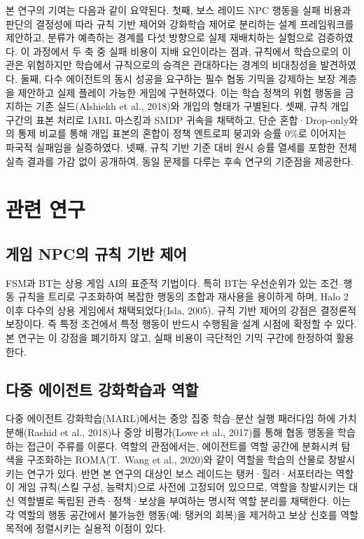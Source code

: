 \documentclass[12pt]{article}      %
\begin{document}
본 연구의 기여는 다음과 같이 요약된다. 첫째, 보스 레이드 NPC 행동을 실패 비용과
판단의 결정성에 따라 규칙 기반 제어와 강화학습 제어로 분리하는 설계 프레임워크를
제안하고, 분류가 예측하는 경계를 다섯 방향으로 실제 재배치하는 실험으로
검증하였다. 이 과정에서 두 축 중 실패 비용이 지배 요인이라는 점과, 규칙에서
학습으로의 이관은 위험하지만 학습에서 규칙으로의 승격은 관대하다는 경계의
비대칭성을 발견하였다. 둘째, 다수 에이전트의 동시 성공을 요구하는 필수 협동
기믹을 강제하는 보장 계층을 제안하고 실제 플레이 가능한 게임에 구현하였다. 이는
학습 정책의 위험 행동을 금지하는 기존 실드(Alshiekh et al., 2018)와 개입의
형태가 구별된다. 셋째, 규칙 개입 구간의 표본 처리로 IARL 마스킹과 SMDP 귀속을
채택하고, 단순 혼합·Drop-only와의 통제 비교를 통해 개입 표본의 혼합이 정책
엔트로피 붕괴와 승률 0\%로 이어지는 파국적 실패임을 실증하였다. 넷째, 규칙 기반
기준 대비 원시 승률 열세를 포함한 전체 실측 결과를 가감 없이 공개하여, 동일
문제를 다루는 후속 연구의 기준점을 제공한다.

\section{관련 연구}

\subsection{게임 NPC의 규칙 기반 제어}

FSM과 BT는 상용 게임 AI의 표준적 기법이다. 특히 BT는 우선순위가 있는 조건--행동
규칙을 트리로 구조화하여 복잡한 행동의 조합과 재사용을 용이하게 하며, Halo 2 이후
다수의 상용 게임에서 채택되었다(Isla, 2005). 규칙 기반 제어의 강점은 결정론적
보장이다. 즉 특정 조건에서 특정 행동이 반드시 수행됨을 설계 시점에 확정할 수
있다. 본 연구는 이 강점을 폐기하지 않고, 실패 비용이 극단적인 기믹 구간에
한정하여 활용한다.

\subsection{다중 에이전트 강화학습과 역할}

다중 에이전트 강화학습(MARL)에서는 중앙 집중 학습--분산 실행 패러다임 하에 가치
분해(Rashid et al., 2018)나 중앙 비평가(Lowe et al., 2017)를 통해 협동 행동을
학습하는 접근이 주류를 이룬다. 역할의 관점에서는, 에이전트를 역할 공간에 분화시켜
탐색을 구조화하는 ROMA(T.~Wang et al., 2020)와 같이 역할을 학습의 산물로
창발시키는 연구가 있다. 반면 본 연구의 대상인 보스 레이드는 탱커·힐러·서포터라는
역할이 게임 규칙(스킬 구성, 능력치)으로 사전에 고정되어 있으므로, 역할을
창발시키는 대신 역할별로 독립된 관측·정책·보상을 부여하는 명시적 역할 분리를
채택한다. 이는 각 역할의 행동 공간에서 불가능한 행동(예: 탱커의 회복)을 제거하고
보상 신호를 역할 목적에 정렬시키는 실용적 이점이 있다.
\end{document}
